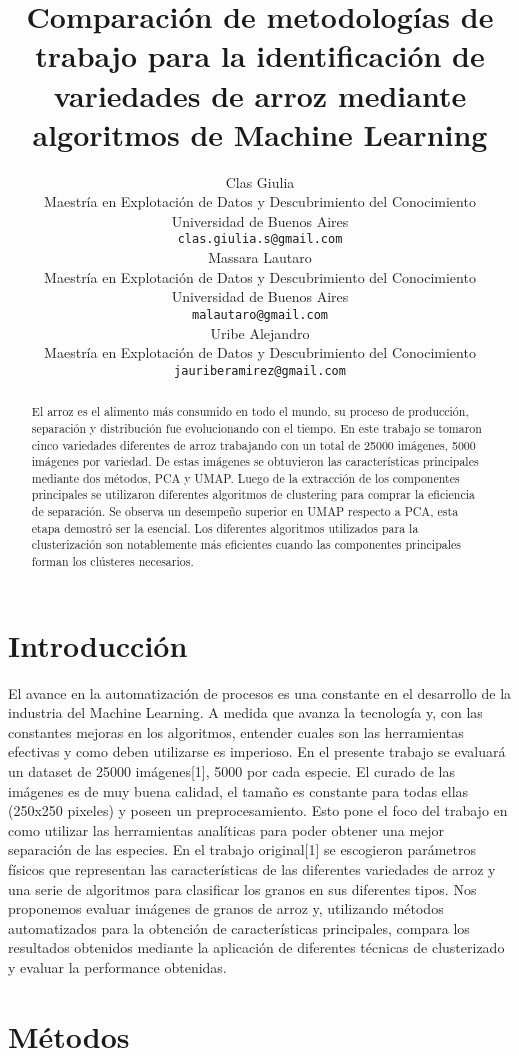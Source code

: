 \documentclass{article}
\title{Comparación de metodologías de trabajo para la identificación de variedades de arroz mediante algoritmos de Machine Learning}
\author{
    Clas Giulia\\
    Maestría en Explotación de Datos y Descubrimiento del Conocimiento\\
    Universidad de Buenos Aires\\
    \texttt{clas.giulia.s@gmail.com} \\
    \And
    Massara Lautaro\\
    Maestría en Explotación de Datos y Descubrimiento del Conocimiento\\
    Universidad de Buenos Aires\\
    \texttt{malautaro@gmail.com} \\
    \And
    Uribe Alejandro \\
    Maestría en Explotación de Datos y Descubrimiento del Conocimiento\\
    \texttt{jauriberamirez@gmail.com}
}
\begin{document}
\maketitle

\begin{abstract}
El arroz es el alimento más consumido en todo el mundo, su proceso de producción, separación y distribución fue evolucionando con el tiempo. En este trabajo se tomaron cinco variedades diferentes de arroz trabajando con un total de 25000 imágenes, 5000 imágenes por variedad. De estas imágenes se obtuvieron las características principales mediante dos métodos, PCA y UMAP. Luego de la extracción de los componentes principales se utilizaron diferentes algoritmos de clustering para comprar la eficiencia de separación. Se observa un desempeño superior en UMAP respecto a PCA, esta etapa demostró ser la esencial. Los diferentes algoritmos utilizados para la clusterización son notablemente más eficientes cuando las componentes principales forman los clústeres necesarios.

\end{abstract}

\section{Introducción}

El avance en la automatización de procesos es una constante en el desarrollo de la industria del Machine Learning. A medida que avanza la tecnología y, con las constantes mejoras en los algoritmos, entender cuales son las herramientas efectivas y como deben utilizarse es imperioso. En el presente trabajo se evaluará un dataset de 25000 imágenes[1], 5000 por cada especie. El curado de las imágenes es de muy buena calidad, el tamaño es constante para todas ellas (250x250 pixeles) y poseen un preprocesamiento. Esto pone el foco del trabajo en como utilizar las herramientas analíticas para poder obtener una mejor separación de las especies.
En el trabajo original[1] se escogieron parámetros físicos que representan las características de las diferentes variedades de arroz y una serie de algoritmos para clasificar los granos en sus diferentes tipos.
Nos proponemos evaluar imágenes de granos de arroz y, utilizando métodos automatizados para la obtención de características principales, compara los resultados obtenidos mediante la aplicación de diferentes técnicas de clusterizado y evaluar la performance obtenidas.

\section{Métodos}
\end{document}
